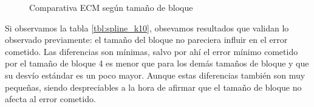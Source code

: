 \begin{figure}[H]
    \centering
    \hspace{10pt}
    \caption{Comparativa ECM seg\'un tama\~no de bloque}
\end{figure}

\par Si observamos la tabla \ref{tbl:spline_k10}, obsevamos resultados que
validan lo observado previamente: el tama\~no del bloque no pareciera influir
en el error cometido. Las diferencias son m\'inimas, salvo por ah\'i el error
m\'inimo cometido por el tama\~no de bloque 4 es menor que para los dem\'as
tama\~nos de bloque y que su desv\'io est\'andar es un poco mayor. Aunque estas
diferencias tambi\'en son muy peque\~nas, siendo despreciables a la hora de
afirmar que el tama\~no de bloque no afecta al error cometido.

